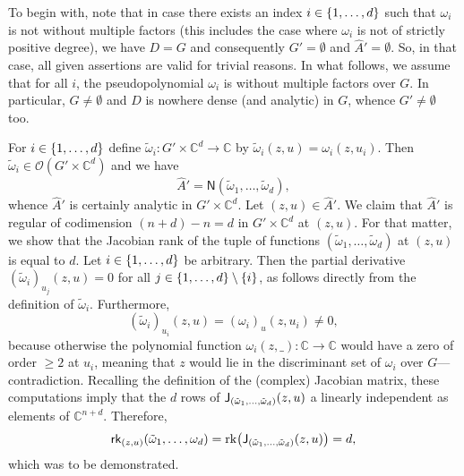 \documentclass[a4paper]{amsart}
\newcommand{\C}{\mathbb{C}}
\newcommand{\Zero}[1]{\mathsf{N}(#1)}
\newcommand{\Jac}[2]{\mathsf{J}_{#1}\paren*{#2}}
\newcommand{\frk}[2]{\mathsf{rk}_{#1}(#2)}
\newcommand{\rk}{\operatorname{rk}}
\renewcommand{\O}{\mathcal{O}}
\theoremstyle{remark}
\numberwithin{equation}{question}
\DeclarePairedDelimiter\set{\{}{\}}
\DeclarePairedDelimiter\paren{(}{)}
\begin{document}
\begin{solution}%
To begin with, note that in case there exists an index $i \in \set{1,\dots,d}$ such that $\omega_i$ is not without multiple factors (this includes the case where $\omega_i$ is not of strictly positive degree), we have $D = G$ and consequently $G' = \emptyset$ and $\hat A' = \emptyset$. So, in that case, all given assertions are valid for trivial reasons. In what follows, we assume that for all $i$, the pseudopolynomial $\omega_i$ is without multiple factors over $G$. In particular, $G \ne \emptyset$ and $D$ is nowhere dense (and analytic) in $G$, whence $G' \ne \emptyset$ too.

\begin{solenum}
\item For $i \in \set{1,\dots,d}$ define $\tilde\omega_i \colon G' \times \C^d \to \C$ by $\tilde\omega_i(z,u) = \omega_i(z,u_i)$. Then $\tilde\omega_i \in \O(G' \times \C^d)$ and we have
\[
\hat A' = \Zero{\tilde\omega_1,\dots,\tilde\omega_d},
\]
whence $\hat A'$ is certainly analytic in $G' \times \C^d$. Let $(z,u) \in \hat A'$. We claim that $\hat A'$ is regular of codimension $(n+d) - n = d$ in $G' \times \C^d$ at $(z,u)$. For that matter, we show that the Jacobian rank of the tuple of functions $(\tilde\omega_1,\dots,\tilde\omega_d)$ at $(z,u)$ is equal to $d$. Let $i \in \set{1,\dots,d}$ be arbitrary. Then the partial derivative $(\tilde\omega_i)_{u_j}(z,u) = 0$ for all $j \in \set{1,\dots,d} \setminus \set i$, as follows directly from the definition of $\tilde\omega_i$. Furthermore,
\[
(\tilde\omega_i)_{u_i}(z,u) = (\omega_i)_u(z,u_i) \ne 0,
\]
because otherwise the polynomial function $\omega_i(z,\_) \colon \C \to \C$ would have a zero of order $\ge 2$ at $u_i$, meaning that $z$ would lie in the discriminant set of $\omega_i$ over $G$---contradiction.
Recalling the definition of the (complex) Jacobian matrix, these computations imply that the $d$ rows of $\Jac{(\tilde\omega_1,\dots,\tilde\omega_d)}{z,u}$ a linearly independent as elements of $\C^{n+d}$. Therefore,
\[
\frk{(z,u)}{\tilde\omega_1,\dots,\omega_d} = \rk\paren*{\Jac{(\tilde\omega_1,\dots,\tilde\omega_d)}{z,u}} = d,
\]
which was to be demonstrated.


\end{solenum}
\end{solution}
\end{document}
